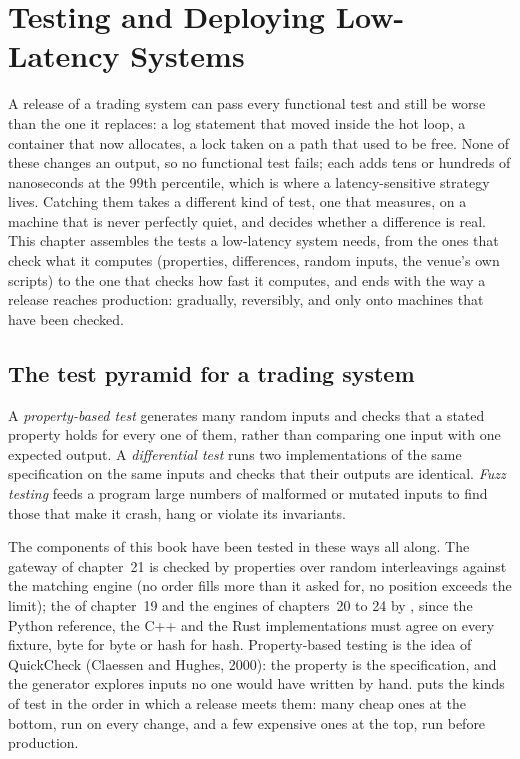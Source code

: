 \chapter{Testing and Deploying Low-Latency Systems}\label{ch:ll:testing-and-deploying-low-latency-systems}

A release of a trading system can pass every functional test and still be worse than the one it replaces: a log statement
that moved inside the hot loop, a container that now allocates, a lock taken on a path that used to be free. None of these
changes an output, so no functional test fails; each adds tens or hundreds of nanoseconds at the 99th percentile, which is
where a latency-sensitive strategy lives. Catching them takes a different kind of test, one that measures, on a machine that
is never perfectly quiet, and decides whether a difference is real. This chapter assembles the tests a low-latency system
needs, from the ones that check what it computes (properties, differences, random inputs, the venue's own scripts) to the one
that checks how fast it computes, and ends with the way a release reaches production: gradually, reversibly, and only onto
machines that have been checked.

\section{The test pyramid for a trading system}

\begin{definition}\label{def:ll:testing-and-deploying-low-latency-systems:tests}
A \emph{property-based test} generates many random inputs and checks that a stated property holds
for every one of them, rather than comparing one input with one expected output. A \emph{differential
test} runs two implementations of the same specification on the same inputs and checks that their
outputs are identical. \emph{Fuzz testing} feeds a program large numbers of malformed or mutated inputs to
find those that make it crash, hang or violate its invariants.
\end{definition}

The components of this book have been tested in these ways all along. The gateway of chapter~21 is checked by properties over
random interleavings against the matching engine (no order fills more than it asked for, no position exceeds the limit); the
 of chapter~19 and the engines of chapters~20 to 24 by , since the Python reference, the C++ and
the Rust implementations must agree on every fixture, byte for byte or hash for hash. Property-based testing is the idea of
QuickCheck (Claessen and Hughes, 2000): the property is the specification, and the generator explores inputs no one would have
written by hand.  puts the kinds of test in the order in which a
release meets them: many cheap ones at the bottom, run on every change, and a few expensive ones at the top, run before
production.

